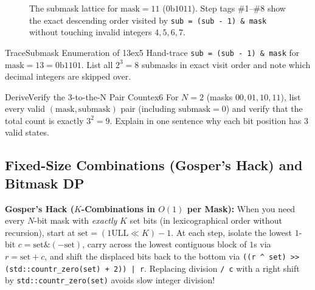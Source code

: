 \documentclass[11pt,a4paper]{article}
\theoremstyle{definition}
\begin{document}
\begin{figure}[htbp]
\caption{The submask lattice for $\text{mask} = 11$ ($0\text{b}1011$). Step tags \#1--\#8 show the exact descending order visited by \texttt{sub = (sub - 1) \& mask} without touching invalid integers $4, 5, 6, 7$.}
\label{fig:submask_lattice}
\end{figure}

\begin{tryitbox}{Trace}{Submask Enumeration of 13}{ex5}
Hand-trace \texttt{sub = (sub - 1) \& mask} for $\text{mask} = 13 = 0\text{b}1101$. List all $2^3 = 8$ submasks in exact visit order and note which decimal integers are skipped over.
\end{tryitbox}

\begin{tryitbox}{Derive}{Verify the 3-to-the-N Pair Count}{ex6}
For $N = 2$ (masks $00, 01, 10, 11$), list every valid $(\text{mask}, \text{submask})$ pair (including $\text{submask} = 0$) and verify that the total count is exactly $3^2 = 9$. Explain in one sentence why each bit position has $3$ valid states.
\end{tryitbox}

\subsection{Fixed-Size Combinations (Gosper's Hack) and Bitmask DP}

\textbf{Gosper's Hack ($K$-Combinations in $O(1)$ per Mask):} When you need every $N$-bit mask with \emph{exactly} $K$ set bits (in lexicographical order without recursion), start at $\text{set} = (1\text{ULL} \ll K) - 1$. At each step, isolate the lowest $1$-bit $c = \text{set} \mathbin{\&} (-\text{set})$, carry across the lowest contiguous block of $1$s via $r = \text{set} + c$, and shift the displaced bits back to the bottom via \texttt{((r \textasciicircum{} set) >> (std::countr\_zero(set) + 2)) | r}. Replacing division \texttt{/ c} with a right shift by \texttt{std::countr\_zero(set)} avoids slow integer division!
\end{document}
